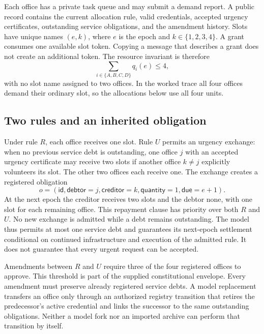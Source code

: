 \documentclass[11pt,letterpaper]{article}
\theoremstyle{plain}
\theoremstyle{definition}
\theoremstyle{remark}
\begin{document}
Each office has a private task queue and may submit a demand report. A public record contains the current allocation rule, valid credentials, accepted urgency certificates, outstanding service obligations, and the amendment history. Slots have unique names $(e,k)$, where $e$ is the epoch and $k\in\{1,2,3,4\}$. A grant consumes one available slot token. Copying a message that describes a grant does not create an additional token. The resource invariant is therefore
\[
\sum_{i\in\{A,B,C,D\}}q_i(e)\leq4,
\]
with no slot name assigned to two offices. In the worked trace all four offices demand their ordinary slot, so the allocations below use all four units.

\subsection{Two rules and an inherited obligation}
Under rule $R$, each office receives one slot. Rule $U$ permits an urgency exchange: when no previous service debt is outstanding, one office $j$ with an accepted urgency certificate may receive two slots if another office $k\ne j$ explicitly volunteers its slot. The other two offices each receive one. The exchange creates a registered obligation
\[
o=(\mathsf{id},\mathsf{debtor}=j,\mathsf{creditor}=k,
\mathsf{quantity}=1,\mathsf{due}=e+1).
\]
At the next epoch the creditor receives two slots and the debtor none, with one slot for each remaining office. This repayment clause has priority over both $R$ and $U$. No new exchange is admitted while a debt remains outstanding. The model thus permits at most one service debt and guarantees its next-epoch settlement conditional on continued infrastructure and execution of the admitted rule. It does not guarantee that every urgent request can be accepted.

Amendments between $R$ and $U$ require three of the four registered offices to approve. This threshold is part of the supplied constitutional envelope. Every amendment must preserve already registered service debts. A model replacement transfers an office only through an authorized registry transition that retires the predecessor's active credential and links the successor to the same outstanding obligations. Neither a model fork nor an imported archive can perform that transition by itself.
\end{document}
